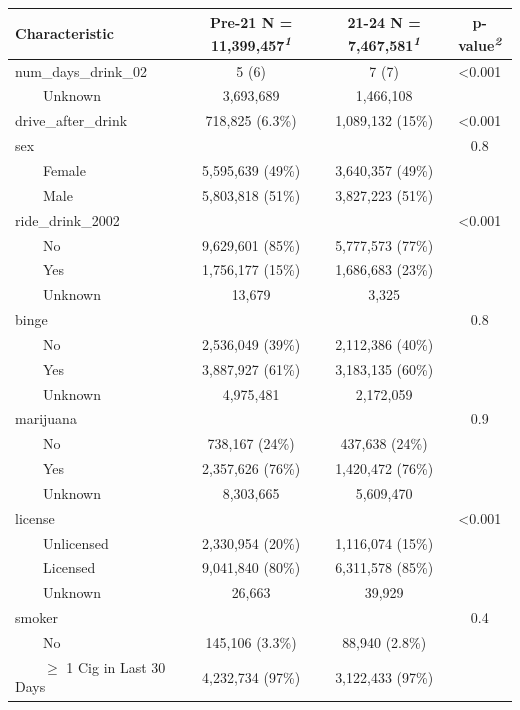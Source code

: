 \documentclass[
]{article}
\begin{document}
\begin{table}[t]
\fontsize{12.0pt}{14.0pt}\selectfont
\begin{tabular*}{\linewidth}{@{\extracolsep{\fill}}lccc}
\toprule
\textbf{Characteristic} & \textbf{Pre-21}  N = 11,399,457\textsuperscript{\textit{1}} & \textbf{21-24}  N = 7,467,581\textsuperscript{\textit{1}} & \textbf{p-value}\textsuperscript{\textit{2}} \\ 
\midrule\addlinespace[2.5pt]
num\_days\_drink\_02 & 5 (6) & 7 (7) & <0.001 \\ 
    Unknown & 3,693,689 & 1,466,108 &  \\ 
drive\_after\_drink & 718,825 (6.3\%) & 1,089,132 (15\%) & <0.001 \\ 
sex &  &  & 0.8 \\ 
    Female & 5,595,639 (49\%) & 3,640,357 (49\%) &  \\ 
    Male & 5,803,818 (51\%) & 3,827,223 (51\%) &  \\ 
ride\_drink\_2002 &  &  & <0.001 \\ 
    No & 9,629,601 (85\%) & 5,777,573 (77\%) &  \\ 
    Yes & 1,756,177 (15\%) & 1,686,683 (23\%) &  \\ 
    Unknown & 13,679 & 3,325 &  \\ 
binge &  &  & 0.8 \\ 
    No & 2,536,049 (39\%) & 2,112,386 (40\%) &  \\ 
    Yes & 3,887,927 (61\%) & 3,183,135 (60\%) &  \\ 
    Unknown & 4,975,481 & 2,172,059 &  \\ 
marijuana &  &  & 0.9 \\ 
    No & 738,167 (24\%) & 437,638 (24\%) &  \\ 
    Yes & 2,357,626 (76\%) & 1,420,472 (76\%) &  \\ 
    Unknown & 8,303,665 & 5,609,470 &  \\ 
license &  &  & <0.001 \\ 
    Unlicensed & 2,330,954 (20\%) & 1,116,074 (15\%) &  \\ 
    Licensed & 9,041,840 (80\%) & 6,311,578 (85\%) &  \\ 
    Unknown & 26,663 & 39,929 &  \\ 
smoker &  &  & 0.4 \\ 
    No & 145,106 (3.3\%) & 88,940 (2.8\%) &  \\ 
    \ensuremath{\geq} 1 Cig in Last 30 Days & 4,232,734 (97\%) & 3,122,433 (97\%) &  \\ 

\end{tabular*}
\end{table}
\end{document}
